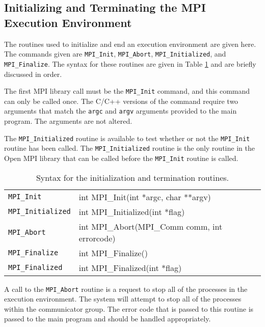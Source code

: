 \subsection{Initializing and Terminating the MPI Execution
  Environment}

The routines used to initialize and end an execution environment are
given here. The commands given are \texttt{MPI\_Init},
\texttt{MPI\_Abort}, \texttt{MPI\_Initialized}, and
\texttt{MPI\_Finalize}. The syntax for these routines are given in
Table \ref{tab:initializeProcessCommands} and are briefly discussed in
order.

The first MPI library call must be the \texttt{MPI\_Init} command, and
this command can only be called once. The C/C++ versions of the
command require two arguments that match the \texttt{argc} and
\texttt{argv} arguments provided to the main program. The arguments
are not altered. 

The \texttt{MPI\_Initialized} routine is available to test whether or
not the \texttt{MPI\_Init} routine has been called.  The
\texttt{MPI\_Initialized} routine is the only routine in the Open MPI
library that can be called before the \texttt{MPI\_Init} routine is
called. 


\begin{table}
  \centering

  \begin{tabular}{ll}
    \texttt{MPI\_Init}        & int MPI\_Init(int *argc, char **argv) \\
    \texttt{MPI\_Initialized} & int MPI\_Initialized(int *flag) \\
    \texttt{MPI\_Abort}       & int MPI\_Abort(MPI\_Comm comm, int errorcode) \\
    \texttt{MPI\_Finalize}    & int MPI\_Finalize() \\
    \texttt{MPI\_Finalized}   & int MPI\_Finalized(int *flag)
  \end{tabular}
\caption{Syntax for the initialization and termination routines.}
\label{tab:initializeProcessCommands}
\end{table}

A call to the \texttt{MPI\_Abort} routine is a request to stop all of
the processes in the execution environment. The system will attempt to
stop all of the processes within the communicator
group.  The error code that is passed
to this routine is passed to the main program and should be handled
appropriately.

